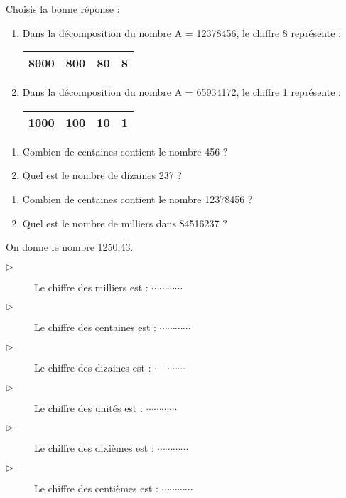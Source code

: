 Choisis la bonne réponse :
\begin{enumerate}
\item Dans la décomposition du nombre A = 12378456, le chiffre 8 représente :
\begin{tabular}{|c|c|c|c|}
\hline 
8000 & 800 & 80 & 8 \\ 
\hline 
\end{tabular}  

\item Dans la décomposition du nombre A = 65934172, le chiffre 1 représente :
\begin{tabular}{|c|c|c|c|}
\hline 
1000 & 100 & 10 & 1 \\ 
\hline 
\end{tabular} 
\end{enumerate}



\begin{enumerate}
\item Combien de centaines contient le nombre 456 ?
\item Quel est le nombre de dizaines 237 ?
\end{enumerate}


\begin{enumerate}
\item Combien de centaines contient le nombre 12378456 ?
\item Quel est le nombre de milliers dans 84516237 ?
\end{enumerate}



On donne le  nombre 1250,43. 
\begin{description}
\item[$\triangleright$] Le chiffre des milliers est : $ \cdots\cdots\cdots\cdots $
\item[$\triangleright$] Le chiffre des centaines est : $ \cdots\cdots\cdots\cdots $
\item[$\triangleright$] Le chiffre des dizaines est : $ \cdots\cdots\cdots\cdots $
\item[$\triangleright$] Le chiffre des unités est : $ \cdots\cdots\cdots\cdots $
\item[$\triangleright$] Le chiffre des dixièmes est : $ \cdots\cdots\cdots\cdots $
\item[$\triangleright$] Le chiffre des centièmes est : $ \cdots\cdots\cdots\cdots $
\end{description}


